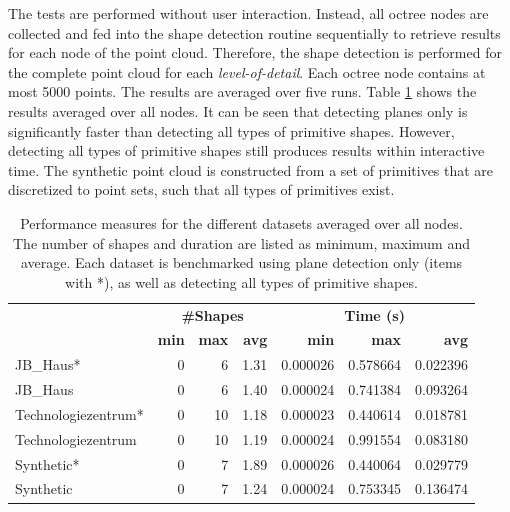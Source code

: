 The tests are performed without user interaction. Instead, all octree nodes are collected and fed into the shape detection routine sequentially to retrieve results for each node of the point cloud. Therefore, the shape detection is performed for the complete point cloud for each \textit{level-of-detail}. Each octree node contains at most 5000 points. The results are averaged over five runs. Table \ref{table:schnabel_benchmarks} shows the results averaged over all nodes. It can be seen that detecting planes only is significantly faster than detecting all types of primitive shapes. However, detecting all types of primitive shapes still produces results within interactive time. The synthetic point cloud is constructed from a set of primitives that are discretized to point sets, such that all types of primitives exist. 

\begin{table}
    \centering
    \begin{tabular}{ l || r | r | r || r | r | r}
            &\multicolumn{3}{c||}{\textbf{\#Shapes}} & \multicolumn{3}{c}{\textbf{Time (s)}}\\
            &\textbf{min} & \textbf{max} & \textbf{avg}  & \textbf{min} & \textbf{max} & \textbf{avg}  \\
            \hline
            JB\_Haus*           & 0 & 6  & 1.31 & 0.000026 & 0.578664 & 0.022396 \\
            JB\_Haus            & 0 & 6  & 1.40 & 0.000024 & 0.741384 & 0.093264 \\
            Technologiezentrum*	& 0 & 10 & 1.18 & 0.000023 & 0.440614 & 0.018781 \\
            Technologiezentrum  & 0 & 10 & 1.19 & 0.000024 & 0.991554 & 0.083180 \\
            Synthetic*          & 0 & 7  & 1.89 & 0.000026 & 0.440064 & 0.029779 \\
            Synthetic           & 0 & 7  & 1.24 & 0.000024 & 0.753345 & 0.136474 \\
        \end{tabular}
    \caption{Performance measures for the different datasets averaged over all nodes. The number of shapes and duration are listed as minimum, maximum and average. Each dataset is benchmarked using plane detection only (items with *), as well as detecting all types of primitive shapes. }
    \label{table:schnabel_benchmarks}
\end{table}


